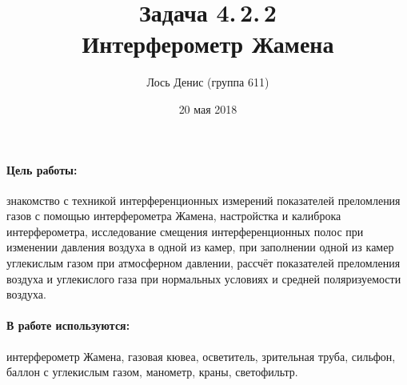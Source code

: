 \documentclass[12pt]{article}
\title{{\bf Задача 4.\,2.\,2 \\ Интерферометр Жамена}}
\author{Лось Денис (группа 611)}
\date{20 мая 2018}
\begin{document}
\maketitle

\paragraph*{Цель работы: } знакомство с техникой интерференционных измерений показателей преломления газов с помощью интерферометра Жамена, настройстка и калиброка интерферометра, исследование смещения интерференционных полос при изменении давления воздуха в одной из камер, при заполнении одной из камер углекислым газом при атмосферном давлении, рассчёт показателей преломления воздуха и углекислого газа при нормальных условиях и средней поляризуемости воздуха.

\paragraph*{В работе используются: } интерферометр Жамена, газовая кювеа, осветитель, зрительная труба, сильфон, баллон с углекислым газом, манометр, краны, светофильтр.
\end{document}
